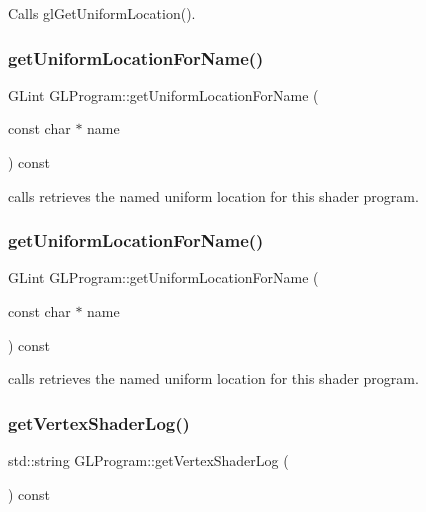 Calls gl\+Get\+Uniform\+Location(). \mbox{\label{classGLProgram_a096688ee4d0f1628f228325e1c64176c}} 
\subsubsection{\texorpdfstring{get\+Uniform\+Location\+For\+Name()}{getUniformLocationForName()}\hspace{0.1cm}{\footnotesize\ttfamily [1/2]}}
{\footnotesize\ttfamily G\+Lint G\+L\+Program\+::get\+Uniform\+Location\+For\+Name (\begin{DoxyParamCaption}\item[{const char $\ast$}]{name }\end{DoxyParamCaption}) const}

calls retrieves the named uniform location for this shader program. \mbox{\label{classGLProgram_a096688ee4d0f1628f228325e1c64176c}} 
\subsubsection{\texorpdfstring{get\+Uniform\+Location\+For\+Name()}{getUniformLocationForName()}\hspace{0.1cm}{\footnotesize\ttfamily [2/2]}}
{\footnotesize\ttfamily G\+Lint G\+L\+Program\+::get\+Uniform\+Location\+For\+Name (\begin{DoxyParamCaption}\item[{const char $\ast$}]{name }\end{DoxyParamCaption}) const}

calls retrieves the named uniform location for this shader program. \mbox{\label{classGLProgram_a82407faaa31b7bd933ba1bc870d62108}} 
\subsubsection{\texorpdfstring{get\+Vertex\+Shader\+Log()}{getVertexShaderLog()}\hspace{0.1cm}{\footnotesize\ttfamily [1/2]}}
{\footnotesize\ttfamily std\+::string G\+L\+Program\+::get\+Vertex\+Shader\+Log (\begin{DoxyParamCaption}{ }\end{DoxyParamCaption}) const}

